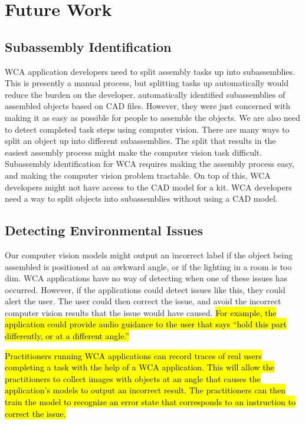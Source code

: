 \section{Future Work}

\subsection{Subassembly Identification}

WCA application developers need to split assembly tasks up into subassemblies.
This is presently a manual process, but splitting tasks up automatically would
reduce the burden on the developer.
\citet{subassembly_identification} automatically identified subassemblies of
assembled objects based on CAD files.
However, they were just concerned with making it as easy as possible for people
to assemble the objects.
We are also need to detect completed task steps using computer vision.
There are many ways to split an object up into different subassemblies.
The split that results in the easiest assembly process might make the computer
vision task difficult.
Subassembly identification for WCA requires making the assembly process easy,
and making the computer vision problem tractable.
On top of this, WCA developers might not have access to the CAD model for a kit.
WCA developers need a way to split objects into subassemblies without using
a CAD model.

\subsection{Detecting Environmental Issues}

Our computer vision models might output an incorrect label if the object being
assembled is positioned at an awkward angle, or if the lighting in a room is
too dim.
WCA applications have no way of detecting when one of these issues has
occurred.
However, if the applications could detect issues like this, they could alert the
user.
The user could then correct the issue, and avoid the incorrect computer vision
results that the issue would have caused.
\hl{
  For example, the application could provide audio guidance to the user that
  says ``hold this part differently, or at a different angle.''
}

\hl{
  Practitioners running WCA applications can record traces of real users
  completing a task with the help of a WCA application.
  This will allow the practitioners to collect images with objects at an angle
  that causes the application's models to output an incorrect result.
  The practitioners can then train the model to recognize an error state that
  corresponds to an instruction to correct the issue.
}

